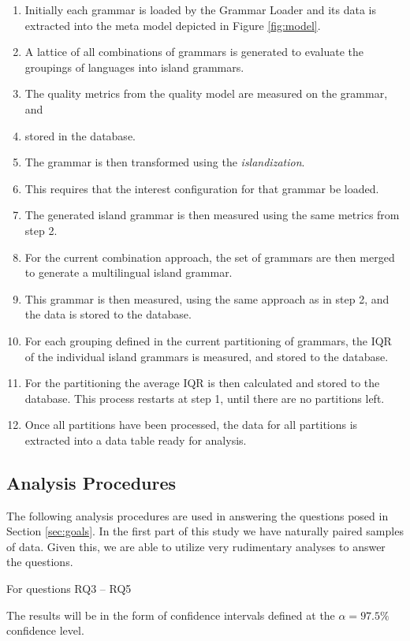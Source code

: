 \documentclass[10pt,nocc]{xrese_report}
\begin{document}
\begin{enumerate}
\item Initially each grammar is loaded by the Grammar Loader and its data is extracted into the meta model depicted in Figure \ref{fig:model}.
\item A lattice of all combinations of grammars is generated to evaluate the groupings of languages into island grammars.
\item The quality metrics from the quality model are measured on the grammar, and
\item stored in the database.
\item The grammar is then transformed using the \textit{islandization}.
\item This requires that the interest configuration for that grammar be loaded.
\item The generated island grammar is then measured using the same metrics from step 2.
\item For the current combination approach, the set of grammars are then merged to generate a multilingual island grammar.
\item This grammar is then measured, using the same approach as in step 2, and the data is stored to the database.
\item For each grouping defined in the current partitioning of grammars, the IQR of the individual island grammars is measured, and stored to the database.
\item For the partitioning the average IQR is then calculated and stored to the database. This process restarts at step 1, until there are no partitions left.
\item Once all partitions have been processed, the data for all partitions is extracted into a data table ready for analysis.
\end{enumerate}

\subsection{Analysis Procedures}

The following analysis procedures are used in answering the questions posed in Section \ref{sec:goals}. In the first part of this study we have naturally paired samples of data. Given this, we are able to utilize very rudimentary analyses to answer the questions.

For questions RQ3 -- RQ5

\noindent The results will be in the form of confidence intervals defined at the $\alpha = 97.5\%$ confidence level.
\end{document}
